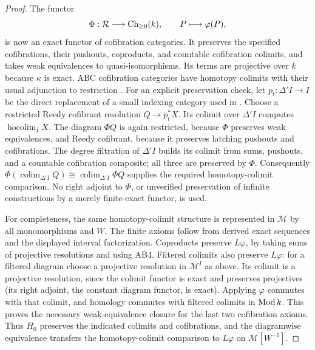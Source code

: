 \begin{proof}
The functor
\[
 \Phi:\mathcal R\longrightarrow\operatorname{Ch}_{\geq0}(k),\qquad P\longmapsto\varphi(P),
\]
is now an exact functor of cofibration categories. It preserves the specified cofibrations, their pushouts, coproducts, and countable cofibration colimits, and takes weak equivalences to quasi-isomorphisms. Its terms are projective over $k$ because $\kappa$ is exact. ABC cofibration categories have homotopy colimits with their usual adjunction to restriction \citep[Theorem 9.6.3]{RadulescuBanu2009}. For an explicit preservation check, let $p_t:\Delta'I\to I$ be the direct replacement of a small indexing category used in \citet[Proposition 9.5.7 and the proof of Theorem 9.6.3]{RadulescuBanu2009}. Choose a restricted Reedy cofibrant resolution $Q\to p_t^*X$. Its colimit over $\Delta'I$ computes $\operatorname{hocolim}_I X$. The diagram $\Phi Q$ is again restricted, because $\Phi$ preserves weak equivalences, and Reedy cofibrant, because it preserves latching pushouts and cofibrations. The degree filtration of $\Delta'I$ builds its colimit from sums, pushouts, and a countable cofibration composite; all three are preserved by $\Phi$. Consequently $\Phi(\operatorname{colim}_{\Delta'I}Q)\cong\operatorname{colim}_{\Delta'I}\Phi Q$ supplies the required homotopy-colimit comparison. No right adjoint to $\Phi$, or unverified preservation of infinite constructions by a merely finite-exact functor, is used.

For completeness, the same homotopy-colimit structure is represented in $\mathcal M$ by all monomorphisms and $W$. The finite axioms follow from derived exact sequences and the displayed interval factorization. Coproducts preserve $L\varphi$, by taking sums of projective resolutions and using AB4. Filtered colimits also preserve $L\varphi$: for a filtered diagram choose a projective resolution in $\mathcal M^I$ as above. Its colimit is a projective resolution, since the colimit functor is exact and preserves projectives (its right adjoint, the constant diagram functor, is exact). Applying $\varphi$ commutes with that colimit, and homology commutes with filtered colimits in $\operatorname{Mod} k$. This proves the necessary weak-equivalence closure for the last two cofibration axioms. Thus $H_0$ preserves the indicated colimits and cofibrations, and the diagramwise equivalence transfers the homotopy-colimit comparison to $L\varphi$ on $\mathcal M[W^{-1}]$.


\end{proof}
